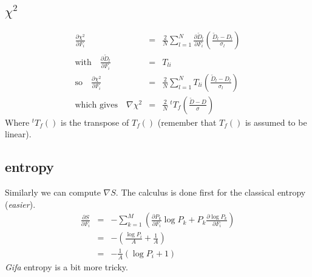 \documentclass[]{article}
\newcommand{\deriv}[2]{\frac{\partial #1}{\partial #2}}
\def\c2{$\chi^2$}
\begin{document}
\subsection{\c2} %
\begin{eqnarray}
	\deriv{\chi^2}{F_i} &=& \frac 2 N \sum_{l=1}^{N} \deriv {\tilde{D}_l}{F_i} \left ( \frac {\tilde{D}_l - D_l} {\sigma_l} \right ) \\
\mbox{with} \quad
	\deriv {\tilde{D}_l}{F_i} &=& T_{li} \\
\mbox{so} \quad
	\deriv{\chi^2}{F_i} &=& \frac 2 N \sum_{l=1}^{N} T_{li} \left ( \frac {\tilde{D}_l - D_l} {\sigma_l} \right )  \\
\mbox{which gives} \quad
	\nabla \chi^2 &=& \frac 2 N \: ^t T_f \left ( \frac {\tilde{D} - D} {\sigma} \right ) \label{dchi2}
\end{eqnarray}
Where $^t T_f()$ is the transpose of $T_f()$ (remember that $T_f()$ is assumed to be linear).
\subsection{entropy} %
Similarly we can compute $\nabla S$. 
The calculus is done first for the classical entropy (\emph{easier}).
\begin{eqnarray}
	\deriv{S}{F_i} &=& - \sum_{k=1}^M \left (
		 \deriv{P_k}{F_i}\log{P_k} + P_k \deriv{\log{P_k}}{F_i}
		\right ) \\
	&=& - \left ( \frac{\log{P_i}}{A} + \frac{1}{A}
		\right ) \\
	&=& - \frac{1}{A} \left ( \log{P_i} + 1 \right )	\label{dSclass}  %
\end{eqnarray}
\emph{Gifa} entropy is a bit more tricky.
\end{document}
